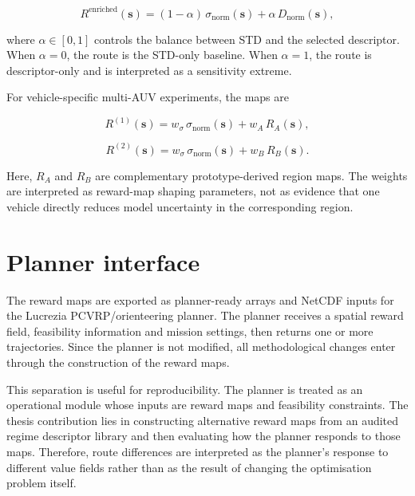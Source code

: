 \begin{equation}
R^{\mathrm{enriched}}(\mathbf{s}) =
(1-\alpha)\,\sigma_{\mathrm{norm}}(\mathbf{s})
+
\alpha\,D_{\mathrm{norm}}(\mathbf{s}),
\label{eq:ch5_single_reward}
\end{equation}

where $\alpha \in [0,1]$ controls the balance between STD and the selected descriptor. When $\alpha=0$, the route is the STD-only baseline. When $\alpha=1$, the route is descriptor-only and is interpreted as a sensitivity extreme.

For vehicle-specific multi-AUV experiments, the maps are

\begin{equation}
R^{(1)}(\mathbf{s}) =
w_{\sigma}\,\sigma_{\mathrm{norm}}(\mathbf{s})
+
w_A\,R_A(\mathbf{s}),
\label{eq:ch5_multi_reward_1}
\end{equation}

\begin{equation}
R^{(2)}(\mathbf{s}) =
w_{\sigma}\,\sigma_{\mathrm{norm}}(\mathbf{s})
+
w_B\,R_B(\mathbf{s}).
\label{eq:ch5_multi_reward_2}
\end{equation}

Here, $R_A$ and $R_B$ are complementary prototype-derived region maps. The weights are interpreted as reward-map shaping parameters, not as evidence that one vehicle directly reduces model uncertainty in the corresponding region.

\section{Planner interface}

The reward maps are exported as planner-ready arrays and NetCDF inputs for the Lucrezia PCVRP/orienteering planner. The planner receives a spatial reward field, feasibility information and mission settings, then returns one or more trajectories. Since the planner is not modified, all methodological changes enter through the construction of the reward maps.

This separation is useful for reproducibility. The planner is treated as an operational module whose inputs are reward maps and feasibility constraints. The thesis contribution lies in constructing alternative reward maps from an audited regime descriptor library and then evaluating how the planner responds to those maps. Therefore, route differences are interpreted as the planner's response to different value fields rather than as the result of changing the optimisation problem itself.

